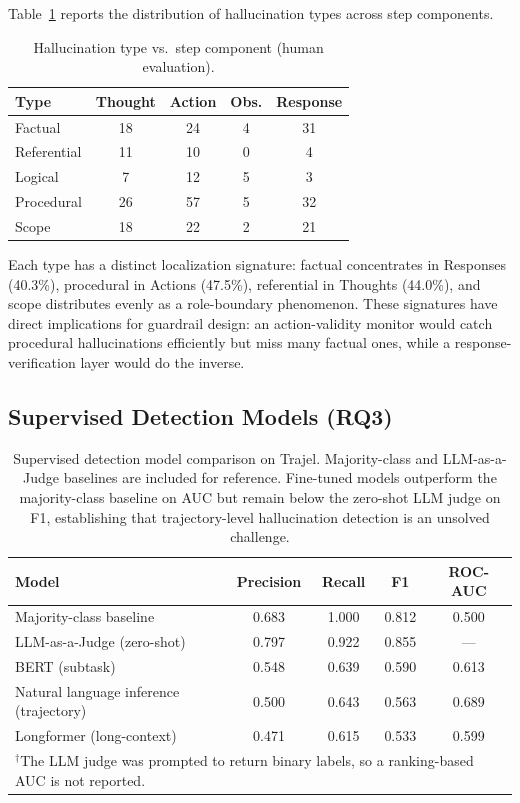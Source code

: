 \documentclass{article}
\begin{document}
Table~\ref{tab:type_location} reports the distribution of hallucination types across step components.

\begin{table}[t]
\caption{Hallucination type vs.\ step component (human evaluation).}
\label{tab:type_location}
\centering
\small
\begin{tabular}{lcccc}
\toprule
\textbf{Type} & \textbf{Thought} & \textbf{Action} & \textbf{Obs.} & \textbf{Response} \\
\midrule
Factual      & 18 & 24 &  4 & 31 \\
Referential  & 11 & 10 &  0 &  4 \\
Logical      &  7 & 12 &  5 &  3 \\
Procedural   & 26 & 57 &  5 & 32 \\
Scope        & 18 & 22 &  2 & 21 \\
\bottomrule
\end{tabular}
\end{table}

Each type has a distinct localization signature: factual concentrates in Responses (40.3\%), procedural in Actions (47.5\%), referential in Thoughts (44.0\%), and scope distributes evenly as a role-boundary phenomenon. These signatures have direct implications for guardrail design: an action-validity monitor would catch procedural hallucinations efficiently but miss many factual ones, while a response-verification layer would do the inverse.

\subsection{Supervised Detection Models (RQ3)}
\label{sec:model_results}

\begin{table}[!h]
\caption{Supervised detection model comparison on Trajel. Majority-class and LLM-as-a-Judge baselines are included for reference. Fine-tuned models outperform the majority-class baseline on AUC but remain below the zero-shot LLM judge on F1, establishing that trajectory-level hallucination detection is an unsolved challenge.}
\label{tab:model_comparison}
\centering
\small
\begin{tabular}{lcccc}
\toprule
\textbf{Model} & \textbf{Precision} & \textbf{Recall} & \textbf{F1} & \textbf{ROC-AUC} \\
\midrule
Majority-class baseline              & 0.683 & 1.000 & 0.812 & 0.500 \\
LLM-as-a-Judge (zero-shot)           & 0.797 & 0.922 & 0.855 & ---\rlap{$^\dagger$} \\
\midrule
BERT (subtask)                          & 0.548 & 0.639 & 0.590 & 0.613 \\
Natural language inference (trajectory) & 0.500 & 0.643 & 0.563 & 0.689 \\
Longformer (long-context)               & 0.471 & 0.615 & 0.533 & 0.599 \\
\bottomrule
\multicolumn{5}{l}{\footnotesize $^\dagger$The LLM judge was prompted to return binary labels, so a ranking-based AUC is not reported.}
\end{tabular}
\end{table}
\end{document}
